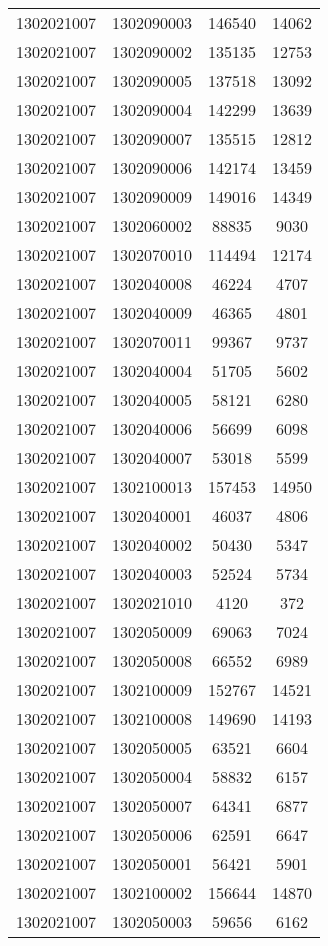 \begin{longtable}{llcc}
1302021007 & 1302090003 & 146540 & 14062\\
1302021007 & 1302090002 & 135135 & 12753\\
1302021007 & 1302090005 & 137518 & 13092\\
1302021007 & 1302090004 & 142299 & 13639\\
1302021007 & 1302090007 & 135515 & 12812\\
1302021007 & 1302090006 & 142174 & 13459\\
1302021007 & 1302090009 & 149016 & 14349\\
1302021007 & 1302060002 & 88835 & 9030\\
1302021007 & 1302070010 & 114494 & 12174\\
1302021007 & 1302040008 & 46224 & 4707\\
1302021007 & 1302040009 & 46365 & 4801\\
1302021007 & 1302070011 & 99367 & 9737\\
1302021007 & 1302040004 & 51705 & 5602\\
1302021007 & 1302040005 & 58121 & 6280\\
1302021007 & 1302040006 & 56699 & 6098\\
1302021007 & 1302040007 & 53018 & 5599\\
1302021007 & 1302100013 & 157453 & 14950\\
1302021007 & 1302040001 & 46037 & 4806\\
1302021007 & 1302040002 & 50430 & 5347\\
1302021007 & 1302040003 & 52524 & 5734\\
1302021007 & 1302021010 & 4120 & 372\\
1302021007 & 1302050009 & 69063 & 7024\\
1302021007 & 1302050008 & 66552 & 6989\\
1302021007 & 1302100009 & 152767 & 14521\\
1302021007 & 1302100008 & 149690 & 14193\\
1302021007 & 1302050005 & 63521 & 6604\\
1302021007 & 1302050004 & 58832 & 6157\\
1302021007 & 1302050007 & 64341 & 6877\\
1302021007 & 1302050006 & 62591 & 6647\\
1302021007 & 1302050001 & 56421 & 5901\\
1302021007 & 1302100002 & 156644 & 14870\\
1302021007 & 1302050003 & 59656 & 6162\\

\end{longtable}
